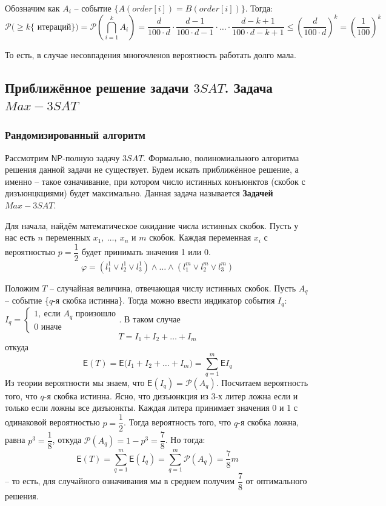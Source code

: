 \documentclass[a4paper,12pt]{article}
\newcommand{\NPclass}{\mathsf{NP}}
\renewcommand{\P}{\mathcal{P}}
\newcommand{\E}{\mathsf{E}}
\begin{document}
Обозначим как $A_i$ -- событие $\{A(order[i]) = B(order[i])\}$. Тогда:
\[\P\big(\geqslant k \{\text{ итераций}\}\big) = \P\left(\bigcap\limits_{i = 1}^k A_i\right) = \dfrac{d}{100\cdot d} \cdot \dfrac{d - 1}{100\cdot d - 1} \cdot \ldots \cdot \dfrac{d - k + 1}{100\cdot d - k + 1} \leqslant \left(\dfrac{d}{100\cdot d}\right)^k =  \left(\dfrac{1}{100}\right)^k\]

То есть, в случае несовпадения многочленов вероятность работать долго мала.

\subsection{Приближённое решение задачи \(3SAT\). Задача \(Max-3SAT\)}

\subsubsection{Рандомизированный алгоритм}

Рассмотрим $\NPclass$-полную задачу $3SAT$. Формально, полиномиального алгоритма решения данной задачи не существует. Будем искать приближённое решение, а именно -- такое означивание, при котором число истинных конъюнктов (скобок с дизъюнцкциями) будет максимально. Данная задача называется \textbf{Задачей} \(Max-3SAT\).

Для начала, найдём математическое ожидание числа истинных скобок. Пусть у нас есть $n$ переменных $x_1,\ \ldots,\ x_n$ и $m$ скобок. Каждая переменная $x_i$ с вероятностью $p = \dfrac{1}{2}$ будет принимать значения 1 или 0.
\[\varphi = (l_1^1 \vee l_2^1 \vee l_3^1) \wedge \ldots \wedge (l_1^m \vee l_2^m \vee l_3^m)\]

Положим $T$ -- случайная величина, отвечающая числу истинных скобок. Пусть $A_q$ -- событие \{$q$-я скобка истинна\}. Тогда можно ввести индикатор события $I_q$: $I_q = \begin{cases}1,\ \text{если }A_q\text{ произошло}\\0\text{ иначе}\end{cases}$. В таком случае
\[T = I_1 + I_2 + \ldots + I_m\] откуда
\[\E(T) = \E\big(I_1 + I_2 + \ldots + I_m\big) = \displaystyle\sum\limits_{q = 1}^m \E I_q\]
Из теории вероятности мы знаем, что $\E (I_q) = \P(A_q)$. Посчитаем вероятность того, что $q$-я скобка истинна. Ясно, что дизъюнкция из 3-х литер ложна если и только если ложны все дизъюнкты. Каждая литера принимает значения 0 и 1 с одинаковой вероятностью $p = \dfrac{1}{2}$. Тогда вероятность того, что $q$-я скобка ложна, равна $p^3 = \dfrac{1}{8}$, откуда $\P(A_q) = 1 - p^3 = \dfrac{7}{8}$. Но тогда:
\[\E (T) = \displaystyle\sum\limits_{q = 1}^m \E (I_q) = \displaystyle\sum\limits_{q = 1}^m \P(A_q) =\dfrac{7}{8}m\] -- то есть, для случайного означивания мы в среднем получим $\dfrac{7}{8}$ от оптимального решения.
\end{document}
